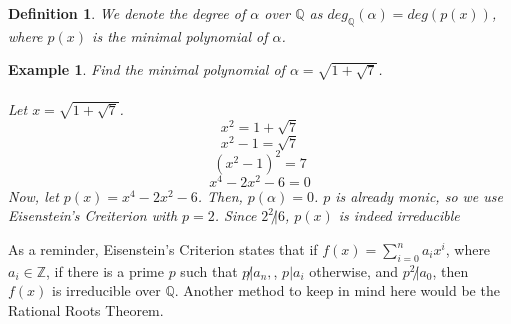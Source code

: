 \documentclass{article}
\newcommand{\Q}{\mathbb{Q}}
\newcommand{\Z}{\mathbb{Z}}
\newtheorem{example}{Example}[subsection]
\newtheorem{definition}{Definition}[subsection]
\begin{document}
\begin{definition}
We denote the degree of $\alpha$ over $\Q$ as $deg_\Q(\alpha)=deg(p(x))$, where $p(x)$ is the minimal polynomial of $\alpha$.
\end{definition}
\begin{example}
Find the minimal polynomial of $\alpha=\sqrt{1+\sqrt{7}}$.\\
\\
Let $x=\sqrt{1+\sqrt{7}}$.
$$x^2=1+\sqrt{7}$$
$$x^2-1 = \sqrt{7}$$
$$(x^2-1)^2=7$$
$$x^4-2x^2-6=0$$
Now, let $p(x)=x^4-2x^2-6$. Then, $p(\alpha)=0$. $p$ is already monic, so we use Eisenstein's Creiterion with $p=2$. Since $2^2\not| 6$, $p(x)$ is indeed irreducible
\end{example}
\noindent As a reminder, Eisenstein's Criterion states that if $f(x)=\displaystyle\sum_{i=0}^n a_ix^i$, where $a_i\in\Z$, if there is a prime $p$ such that $p\not | a_n,$, $p|a_i$ otherwise, and $p^2\not| a_0$, then $f(x)$ is irreducible over $\Q$. Another method to keep in mind here would be the Rational Roots Theorem.
\end{document}
